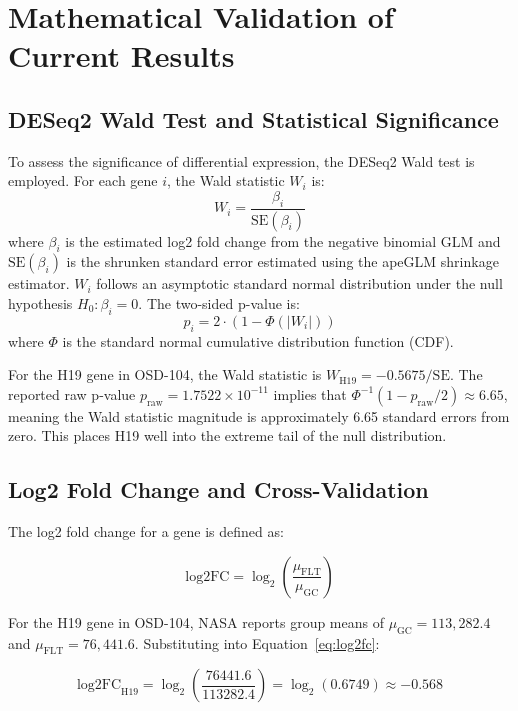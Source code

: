 \documentclass[conference]{IEEEtran}
\begin{document}
\section{Mathematical Validation of Current Results}

\subsection{DESeq2 Wald Test and Statistical Significance}
To assess the significance of differential expression, the DESeq2 Wald test is employed. For each gene $i$, the Wald statistic $W_i$ is:
\begin{equation}
W_i = \frac{\beta_i}{\text{SE}(\beta_i)}
\label{eq:wald_stat}
\end{equation}
where $\beta_i$ is the estimated log2 fold change from the negative binomial GLM and $\text{SE}(\beta_i)$ is the shrunken standard error estimated using the apeGLM shrinkage estimator. $W_i$ follows an asymptotic standard normal distribution under the null hypothesis $H_0: \beta_i = 0$. The two-sided p-value is:
\begin{equation}
p_i = 2 \cdot (1 - \Phi(|W_i|))
\label{eq:wald_pval}
\end{equation}
where $\Phi$ is the standard normal cumulative distribution function (CDF).

For the H19 gene in OSD-104, the Wald statistic is $W_{\text{H19}} = -0.5675 / \text{SE}$. The reported raw p-value $p_{\text{raw}} = 1.7522 \times 10^{-11}$ implies that $\Phi^{-1}(1 - p_{\text{raw}}/2) \approx 6.65$, meaning the Wald statistic magnitude is approximately 6.65 standard errors from zero. This places H19 well into the extreme tail of the null distribution.

\subsection{Log2 Fold Change and Cross-Validation}

The log2 fold change for a gene is defined as:

\begin{equation}
\text{log2FC} = \log_2\!\left(\frac{\mu_{\text{FLT}}}{\mu_{\text{GC}}}\right)
\label{eq:log2fc}
\end{equation}

For the H19 gene in OSD-104, NASA reports group means of $\mu_{\text{GC}} = 113{,}282.4$ and $\mu_{\text{FLT}} = 76{,}441.6$. Substituting into Equation~\ref{eq:log2fc}:

\begin{equation}
\text{log2FC}_{\text{H19}} = \log_2\!\left(\frac{76441.6}{113282.4}\right) = \log_2(0.6749) \approx -0.568
\label{eq:h19fc}
\end{equation}
\end{document}
